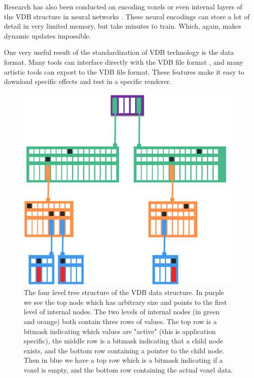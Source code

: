 Research has also been conducted on encoding voxels or even internal layers of the VDB structure in neural networks \cite{kim2022neuralvdb}. These neural encodings can store a lot of detail in very limited memory, but take minutes to train. Which, again, makes dynamic updates impossible.

One very useful result of the standardization of VDB technology is the data format. Many tools can interface directly with the VDB file format \cite{VDBADeepDive}, and many artistic tools can export to the VDB file format. These features make it easy to download specific effects and test in a specific renderer.

\begin{figure}[H]
    \centering
    \includegraphics[width=0.9\linewidth]{figures/OpenVDB.png}
    \caption{The four level tree structure of the VDB data structure. In purple we see the top node which has arbitrary size and points to the first level of internal nodes. The two levels of internal nodes (in green and orange) both contain three rows of values. The top row is a bitmask indicating which values are "active" (this is application specific), the middle row is a bitmask indicating that a child node exists, and the bottom row containing a pointer to the child node. Then in blue we have a top row which is a bitmask indicating if a voxel is empty, and the bottom row containing the actual voxel data. \cite{museth2013vdb}}
    \label{fig:VDB}
\end{figure}




